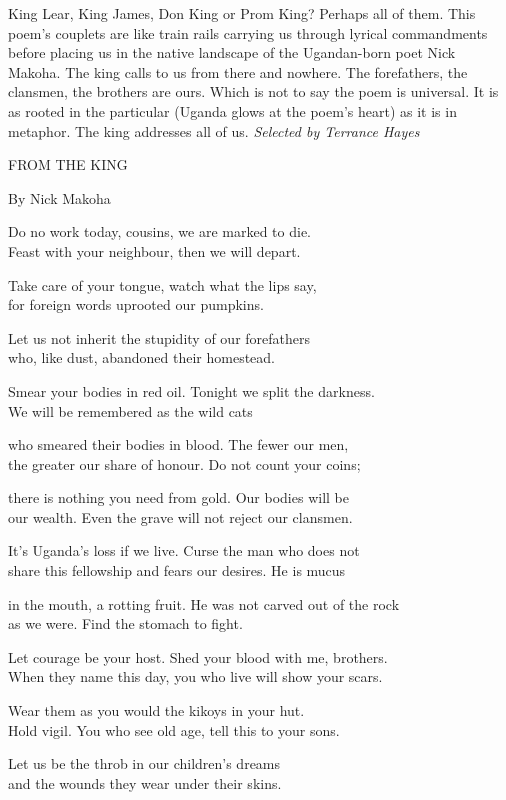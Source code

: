 King Lear, King James, Don King or Prom King? Perhaps all of them. This
poem's couplets are like train rails carrying us through lyrical
commandments before placing us in the native landscape of the
Ugandan-born poet Nick Makoha. The king calls to us from there and
nowhere. The forefathers, the clansmen, the brothers are ours. Which is
not to say the poem is universal. It is as rooted in the particular
(Uganda glows at the poem's heart) as it is in metaphor. The king
addresses all of us. \emph{Selected by Terrance Hayes}

FROM THE KING

By Nick Makoha

Do no work today, cousins, we are marked to die.\\
Feast with your neighbour, then we will depart.

Take care of your tongue, watch what the lips say,\\
for foreign words uprooted our pumpkins.

Let us not inherit the stupidity of our forefathers\\
who, like dust, abandoned their homestead.

Smear your bodies in red oil. Tonight we split the darkness.\\
We will be remembered as the wild cats

who smeared their bodies in blood. The fewer our men,\\
the greater our share of honour. Do not count your coins;

there is nothing you need from gold. Our bodies will be\\
our wealth. Even the grave will not reject our clansmen.

It's Uganda's loss if we live. Curse the man who does not\\
share this fellowship and fears our desires. He is mucus

in the mouth, a rotting fruit. He was not carved out of the rock\\
as we were. Find the stomach to fight.

Let courage be your host. Shed your blood with me, brothers.\\
When they name this day, you who live will show your scars.

Wear them as you would the kikoys in your hut.\\
Hold vigil. You who see old age, tell this to your sons.

Let us be the throb in our children's dreams\\
and the wounds they wear under their skins.


